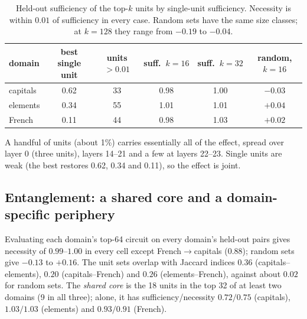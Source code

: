 \documentclass[11pt]{article}
\begin{document}
\begin{table}[h]
\centering\small
\begin{tabular}{lccccc}
\toprule
domain & best single unit & units $>0.01$ & suff.\ $k{=}16$ & suff.\ $k{=}32$ & random, $k{=}16$\\
\midrule
capitals & 0.62 & 33 & 0.98 & 1.00 & $-0.03$\\
elements & 0.34 & 55 & 1.01 & 1.01 & $+0.04$\\
French   & 0.11 & 44 & 0.98 & 1.03 & $+0.02$\\
\bottomrule
\end{tabular}
\caption{Held-out sufficiency of the top-$k$ units by single-unit sufficiency. Necessity is within $0.01$ of sufficiency in every case. Random sets have the same
size classes; at $k{=}128$ they range from $-0.19$ to $-0.04$.}
\label{tab:circuits}
\end{table}
A handful of units (about 1\%) carries essentially all of the effect, spread over layer 0 (three units), layers 14--21 and a few at layers 22--23. Single units are weak
(the best restores 0.62, 0.34 and 0.11), so the effect is joint.

\subsection{Entanglement: a shared core and a domain-specific periphery}
Evaluating each domain's top-64 circuit on every domain's held-out pairs gives necessity of $0.99$--$1.00$ in every cell except French$\to$capitals ($0.88$); random sets give $-0.13$ to $+0.16$.
The unit sets overlap with Jaccard indices $0.36$ (capitals--elements), $0.20$ (capitals--French) and $0.26$ (elements--French), against about $0.02$ for random sets. The \emph{shared core} is the 18 units in the top 32 of at least two domains
(9 in all three); alone, it has sufficiency/necessity $0.72/0.75$ (capitals), $1.03/1.03$ (elements) and $0.93/0.91$ (French).
\end{document}
